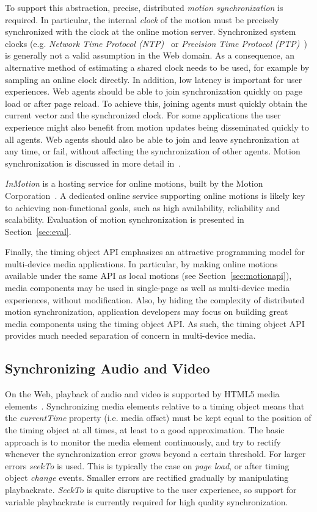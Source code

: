 \documentclass[graybox]{svmult}
\begin{document}
To support this abstraction, precise, distributed \emph{motion
synchronization} is required. In particular, the internal \emph{clock} of the
motion must be precisely synchronized with the clock at the online motion
server. Synchronized system clocks (e.g. \emph{Network Time Protocol (NTP)}~\cite{ntp} or \emph{Precision Time Protocol (PTP)}~\cite{ptp}) is
generally not a valid assumption in the Web domain.  As a consequence, an
alternative method of estimating a shared clock needs to be used, for example
by sampling an online clock directly. In addition, low latency is important
for user experiences. Web agents should be able to join synchronization
quickly on page load or after page reload. To achieve this, joining agents
must quickly obtain the current vector and the synchronized clock. For some
applications the user experience might also benefit from motion updates being
disseminated quickly to all agents. Web agents should also be able to join and
leave synchronization at any time, or fail, without affecting the
synchronization of other agents. Motion synchronization is discussed in more
detail in~\cite{msv}.

\emph{InMotion} is a hosting service for online motions, built by the Motion Corporation~\cite{mcorp}. A dedicated online service supporting
online motions is likely key to achieving non-functional goals, such as
high availability, reliability and scalability. Evaluation of
motion synchronization is presented in Section~\ref{sec:eval}.

Finally, the timing object API emphasizes an attractive programming model for
multi-device media applications. In particular, by making online motions
available under the same API as local motions (see Section~\ref{sec:motionapi}),
media components may be used in single-page as well as multi-device media
experiences, without modification. Also, by hiding the complexity of
distributed motion synchronization, application developers may focus on
building great media components using the timing object API. As such, the
timing object API provides much needed separation of concern in multi-device
media.

\subsection{Synchronizing Audio and Video}
\label{sec:avsync}

On the Web, playback of audio and video is supported by HTML5 media
elements~\cite{html5media}. Synchronizing media elements relative to a timing
object means that the \emph{currentTime} property (i.e. media offset) must be
kept equal to the position of the timing object at all times, at least to a
good approximation. The basic approach is to monitor the media
element continuously, and try to rectify whenever the synchronization error
grows beyond a certain threshold. For larger errors \emph{seekTo} is used. This is
typically the case on \emph{page load}, or after timing object \emph{change} events. Smaller
errors are rectified gradually by manipulating playbackrate. \emph{SeekTo} is
quite disruptive to the user experience, so support for variable playbackrate
is currently required for high quality synchronization.
\end{document}
